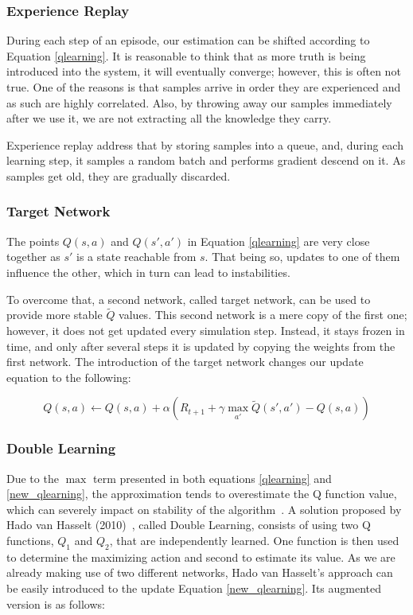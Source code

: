 \documentclass[11pt,twoside]{article}
\begin{document}
\subsubsection{Experience Replay}\label{experience}

During each step of an episode, our estimation can be shifted according to Equation \ref{qlearning}. It is reasonable to think that as more truth is being introduced into the system, it will eventually converge; however, this is often not true. One of the reasons is that samples arrive in order they are experienced and as such are highly correlated. Also, by throwing away our samples immediately after we use it, we are not extracting all the knowledge they carry.

Experience replay address that by storing samples into a queue, and, during each learning step, it samples a random batch and performs gradient descend on it. As samples get old, they are gradually discarded.

\subsubsection{Target Network}

The points $Q(s, a)$ and $Q(s', a')$ in Equation \ref{qlearning} are very close together as $s'$ is a state reachable from $s$. That being so, updates to one of them influence the other, which in turn can lead to instabilities.

To overcome that, a second network, called target network, can be used to provide more stable $\widetilde{Q}$ values. This second network is a mere copy of the first one; however, it does not get updated every simulation step. Instead, it stays frozen in time, and only after several steps it is updated by copying the weights from the first network. The introduction of the target network changes our update equation to the following:

\begin{equation} \label{new_qlearning}
	Q(s, a) \leftarrow Q(s, a) + \alpha (R_{t+1} + \gamma \max_{a'}\widetilde{Q}(s', a') - Q(s,a))
\end{equation}


\subsubsection{Double Learning}\label{double_learning}

Due to the $\max$ term presented in both equations \ref{qlearning} and \ref{new_qlearning}, the approximation tends to overestimate the Q function value, which can severely impact on stability of the algorithm~\cite{overestimation}. A solution proposed by Hado van Hasselt (2010)~\cite{doubleq2010}, called Double Learning, consists of using two Q functions, $Q_1$ and $Q_2$, that are independently learned. One function is then used to determine the maximizing action and second to estimate its value. As we are already making use of two different networks, Hado van Hasselt's approach can be easily introduced to the update Equation \ref{new_qlearning}. Its augmented version is as follows:
\end{document}

